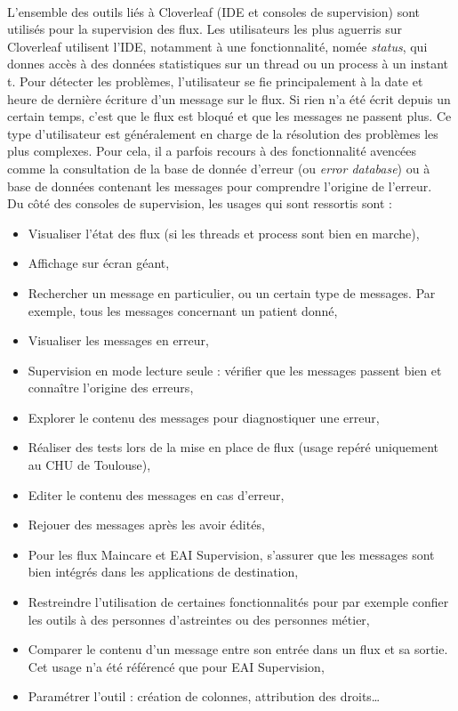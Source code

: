 			\paragraph{}%
			L’ensemble des outils liés à Cloverleaf (IDE et consoles de supervision)
			sont utilisés pour la supervision des flux. Les utilisateurs les plus
			aguerris sur Cloverleaf utilisent l’IDE, notamment à une fonctionnalité,
			nomée \textit{status}, qui donnes accès à des données statistiques sur un
			thread ou un process à un instant t. Pour détecter les problèmes,
			l’utilisateur se fie principalement à la date et heure de dernière écriture
			d’un message sur le flux. Si rien n’a été écrit depuis un certain temps, c’est que
			le flux est bloqué et que les messages ne passent plus. Ce type d’utilisateur est
			généralement en charge de la résolution des problèmes les plus complexes.
			Pour cela, il a parfois recours à des fonctionnalité avencées comme la
			consultation de la base de donnée d'erreur (ou \textit{error database}) ou
			à base de données contenant les messages pour comprendre l’origine de
			l’erreur.\\
			Du côté des consoles de supervision, les usages qui sont ressortis sont :
			\begin{itemize}
			  \item Visualiser l’état des flux (si les threads et process sont bien en
			  marche),
			  \item Affichage sur écran géant,
			  \item Rechercher un message en particulier, ou un certain type de
			  messages. Par exemple, tous les messages concernant un patient donné,
			  \item Visualiser les messages en erreur,
			  \item Supervision en mode lecture seule : vérifier que les messages
			  passent bien et connaître l’origine des erreurs,
			  \item Explorer le contenu des messages pour diagnostiquer une erreur,
			  \item Réaliser des tests lors de la mise en place de flux (usage repéré
			  uniquement au CHU de Toulouse),
			  \item Editer le contenu des messages en cas d’erreur,
			  \item Rejouer des messages après les avoir édités,
			  \item Pour les flux Maincare et EAI Supervision, s’assurer que les
			  messages sont bien intégrés dans les applications de destination,
			  \item Restreindre l’utilisation de certaines fonctionnalités pour par
			  exemple confier les outils à des personnes d’astreintes ou des personnes
			  métier,
			  \item Comparer le contenu d’un message entre son entrée dans un flux et
			  sa sortie. Cet usage n’a été référencé que pour EAI Supervision,
			  \item Paramétrer l’outil : création de colonnes, attribution des droits…
			\end{itemize}
